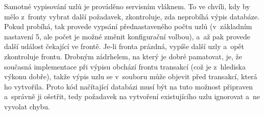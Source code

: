 Samotné vypisování uzlů je prováděno servisním vláknem. To ve chvíli, kdy by mělo
z~fronty vybrat další požadavek, zkontroluje, zda neprobíhá výpis databáze.
Pokud probíhá,
tak provede vypsání přednastaveného počtu uzlů (v~základním nastavení 5,
ale počet je možné změnit
konfigurační volbou), a~až pak provede další událost čekající ve frontě. Je-li fronta
prázdná, vypíše další uzly a~opět zkontroluje frontu. Drobným zádrhelem, na který je
dobré pamatovat, je, že současná implementace při výpisu obchází frontu transakcí
(což je z~hlediska výkonu dobře),
takže výpis uzlu se v~souboru může objevit před transakcí, která ho vytvořila.
Proto kód načítající databázi musí být na tuto možnost připraven a~správně ji ošetřit,
tedy požadavek na vytvoření existujícího uzlu ignorovat a~ne vyvolat chybu.

